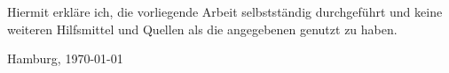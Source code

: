 \newpage
\thispagestyle{empty}
\vspace{3cm}

{
Hiermit erkl\"are ich, die vorliegende Arbeit selbstst\"andig durchgef\"uhrt und keine weiteren Hilfsmittel und Quellen als die angegebenen genutzt zu haben.
}
\vspace{3cm}

Hamburg, \today  \hfill  \authorfirstname\, \authorfamilyname